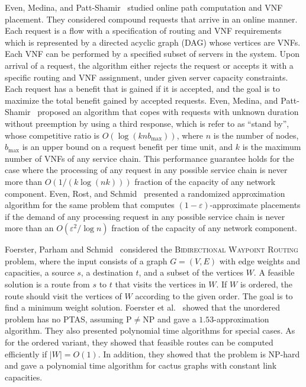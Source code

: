 \documentclass[11pt]{article}
\newcommand{\abs}[1]{\left| #1 \right|}
\newcommand{\eps}{\varepsilon}
\begin{document}
Even, Medina, and Patt-Shamir~\cite{EMP16} studied online path
computation and VNF placement.  They considered compound requests that
arrive in an online manner.  Each request is a flow with a
specification of routing and VNF requirements which is represented by
a directed acyclic graph (DAG) whose vertices are VNFs.  Each VNF can
be performed by a specified subset of servers in the system.  Upon
arrival of a request, the algorithm either rejects the request or
accepts it with a specific routing and VNF assignment, under given
server capacity constraints.  Each request has a benefit that is
gained if it is accepted, and the goal is to maximize the total
benefit gained by accepted requests.
%
Even, Medina, and Patt-Shamir~\cite{EMP16} proposed an algorithm that
copes with requests with unknown duration without preemption by using
a third response, which is refer to as “stand by”, whose competitive
ratio is $O(\log (knb_{\max}))$, where $n$ is the number of nodes,
$b_{\max}$ is an upper bound on a request benefit per time unit, and
$k$ is the maximum number of VNFs of any service chain.  This
performance guarantee holds for the case where the processing of any
request in any possible service chain is never more than
$O(1/(k \log (nk)))$ fraction of the capacity of any network
component.
%
Even, Rost, and Schmid~\cite{ERS16} presented a randomized
approximation algorithm for the same problem that computes
$(1-\eps)$-approximate placements if the demand of any processing
request in any possible service chain is never more than an
$O(\eps^2/\log n)$ fraction of the capacity of any network component.

Foerster, Parham and Schmid~\cite{FPS17} considered the
\textsc{Bidirectional Waypoint Routing} problem, where the input
consists of a graph $G = (V,E)$ with edge weights and capacities, a
source $s$, a destination $t$, and a subset of the vertices $W$.  A
feasible solution is a route from $s$ to $t$ that visits the vertices
in $W$.  If $W$ is ordered, the route should visit the vertices of $W$
according to the given order.  The goal is to find a minimum weight
solution.
%
Foerster et al.~\cite{FPS17} showed that the unordered
problem has no PTAS, assuming P$\neq$NP and gave a
$1.53$-approximation algorithm.  They also presented polynomial time
algorithms for special cases.
%
As for the ordered variant, they showed that feasible routes can be
computed efficiently if $\abs{W} = O(1)$.  In addition, they showed
that the problem is NP-hard and gave a polynomial time algorithm for
cactus graphs with constant link capacities.
\end{document}
